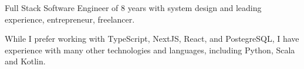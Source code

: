 


\begin{cvparagraph}

Full Stack Software Engineer of 8 years with system design and leading experience, entrepreneur, freelancer.

While I prefer working with TypeScript, NextJS, React, and PostegreSQL, I have experience with many other technologies and languages, including Python, Scala and Kotlin.

\end{cvparagraph}